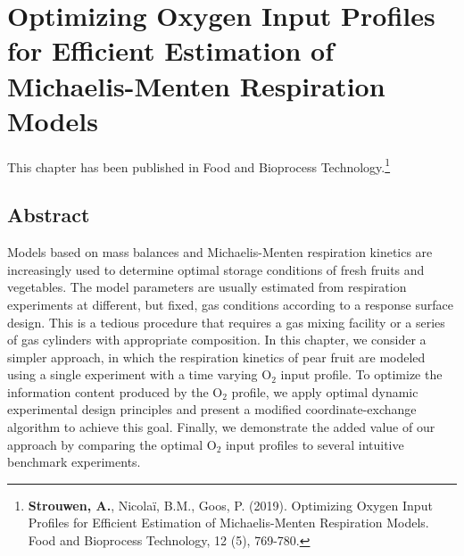 \cleardoublepage
\chapter{Optimizing Oxygen Input Profiles for Efficient Estimation of Michaelis-Menten Respiration Models}
\label{paper1}
This chapter has been published in Food and Bioprocess Technology.\footnote{\textbf{Strouwen, A.}, Nicolaï, B.M., Goos, P. (2019). Optimizing Oxygen Input Profiles for Efficient Estimation of Michaelis-Menten Respiration Models. Food and Bioprocess Technology, 12 (5), 769-780. }
\section*{Abstract}
Models based on mass balances and Michaelis-Menten respiration kinetics are increasingly used to determine optimal storage conditions of fresh fruits and vegetables. The model parameters are usually estimated from respiration experiments at different, but fixed, gas conditions according to a response surface design. This is a tedious procedure that requires a gas mixing facility or a series of gas cylinders with appropriate composition. In this chapter, we consider a simpler approach, in which the respiration kinetics of pear fruit are modeled using a single experiment with a time varying $\text{O}_2$ input profile. To optimize the information content produced by the $\text{O}_2$ profile, we apply optimal dynamic experimental design principles and present a modified coordinate-exchange algorithm to achieve this goal. Finally, we demonstrate the added value of our approach by comparing the optimal $\text{O}_2$ input profiles to several intuitive benchmark experiments.
